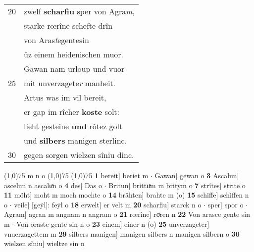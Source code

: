 \documentclass[8pt,a4paper,notitlepage]{article}
\begin{document}
\begin{table}[ht]
\begin{minipage}[t]{0.5\linewidth}
\begin{tabular}{rl}
20 & zwelf \textbf{scharfiu} sper von Agra\textit{m},\\ 
 & starke rœrîne schefte drîn\\ 
 & von Aras\textit{t}egentesin\\ 
 & ûz einem heidenischen muor.\\ 
 & Gawan nam urloup und vuor\\ 
25 & mit unverzagete\textit{r} manheit.\\ 
 & Artus was im vil bereit,\\ 
 & er gap im rîcher \textbf{koste} solt:\\ 
 & lieht gesteine \textbf{und} rôtez golt\\ 
 & und \textbf{silbers} manigen sterlinc.\\ 
30 & gegen sorgen wielzen sîniu dinc.\\ 
\end{tabular}
\scriptsize
\line(1,0){75} \newline
m n o \newline
\line(1,0){75} \newline
\newline
\line(1,0){75} \newline
\textbf{1} bereit] beriet m  $\cdot$ Gawan] gewan o \textbf{3} Ascalun] ascelun n ascaluͯn o \textbf{4} des] Das o  $\cdot$ Britun] brittuͯm m britẏm o \textbf{7} strîtes] strite o \textbf{11} möht] moht m moch mochte o \textbf{14} brâhten] brahte m (o) \textbf{15} schiffe] schiffen n o  $\cdot$ veile] [geẏl]: feẏl o \textbf{18} erwelt] er velt m \textbf{20} scharfiu] starck n o  $\cdot$ sper] spor o  $\cdot$ Agram] agran m angnam n angram o \textbf{21} rœrîne] roͯren n \textbf{22} Von arasce gente sin m  $\cdot$ Von oraste gente sin n o \textbf{23} einem] einer n (o) \textbf{25} unverzageter] vnuerzagettem m \textbf{29} silbers manigen] manigen silbers n manigen silbern o \textbf{30} wielzen sîniu] wieltze sin n \newline
\end{minipage}
\end{table}
\newpage
\end{document}
